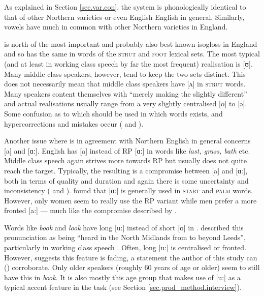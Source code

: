 As explained in Section \ref{sec.var.con}, the   system is phonologically identical to that of other Northern varieties or even English English in general.
Similarly,  vowels have much in common with other Northern varieties in England.

 is north of the most important and probably also best known isogloss in England and so has the same  in words of the \textsc{strut} and \textsc{foot} lexical sets.
The most typical (and at least in working class speech by far the most frequent) realisation is [ʊ].
Many middle class speakers, however, tend to keep the two sets distinct.
This does not necessarily mean that middle class speakers have [ʌ] in \textsc{strut} words.
Many speakers content themselves with ``merely making the  slightly different'' \citep[284]{knowles1973} and actual realisations usually range from a very slightly centralised [ʊ] to [ə].
Some confusion as to which  should be used in which words exists, and hypercorrections and mistakes occur (\cite[286--287]{knowles1973} and \cite[83]{knowles1978}).

Another issue where  is in agreement with Northern English in general concerns [a] and [ɑː].
 English has [a] instead of RP [ɑː] in words like \emph{last, grass, bath} etc.
Middle class speech again strives more towards RP but usually does not quite reach the target.
Typically, the resulting  is a compromise between [a] and [ɑː], both in terms of quality and duration and again there is some uncertainty and inconsistency (\citealp[cf.][287--289]{knowles1973} and \citeyear[83--84]{knowles1978}).
\citeauthor{watson2007} found that [ɑː] is generally used in \textsc{start} and \textsc{palm} words.
However, only women seem to really use the RP variant while men prefer a more fronted [a:] \parencite[cf.][358]{watson2007} --- much like the compromise described by \cite{knowles1973}.

Words like \emph{book} and \emph{look} have long [u:] instead of short [ʊ] in .
\citet{knowles1973} described this pronunciation as being ``heard in the North Midlands from  to beyond Leeds'', particularly in working class speech \citep[290]{knowles1973}.
Often, long [u:] is centralised or fronted.
However, \citet[358]{watson2007} suggests this feature is fading, a statement the author of this study can () corroborate.
Only older speakers (roughly 60 years of age or older) seem to still have this  in \emph{book}.
It is also mostly this age group that makes use of [u:] as a typical accent feature in the  task (see Section \ref{sec.prod_method.interview}).

